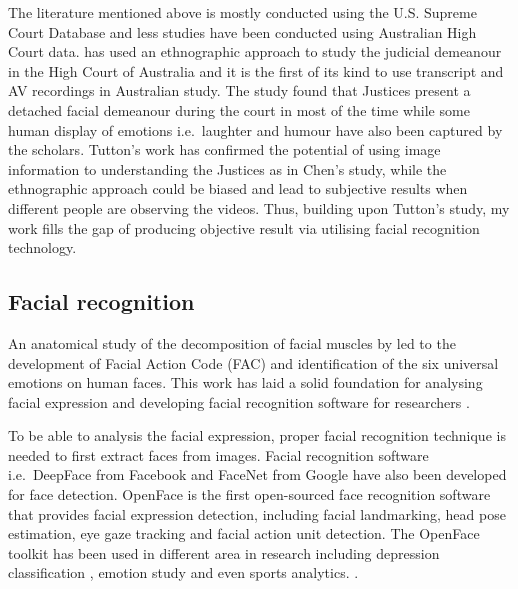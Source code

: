 \documentclass{monashthesis}
\begin{document}
The literature mentioned above is mostly conducted using the U.S. Supreme Court Database and less studies have been conducted using Australian High Court data. \textcite{tutton2018judicial} has used an ethnographic approach to study the judicial demeanour in the High Court of Australia and it is the first of its kind to use transcript and AV recordings in Australian study. The study found that Justices present a detached facial demeanour during the court in most of the time while some human display of emotions i.e.~laughter and humour have also been captured by the scholars. Tutton's work has confirmed the potential of using image information to understanding the Justices as in Chen's study, while the ethnographic approach could be biased and lead to subjective results when different people are observing the videos. Thus, building upon Tutton's study, my work fills the gap of producing objective result via utilising facial recognition technology.

\hypertarget{facial-recognition}{%
\subsection{Facial recognition}\label{facial-recognition}}

An anatomical study of the decomposition of facial muscles by \autocite{ekman1976measuring} led to the development of Facial Action Code (FAC) \autocite{ekman1978} and identification of the six universal emotions on human faces. This work has laid a solid foundation for analysing facial expression and developing facial recognition software for researchers \autocites{Kobayashi1992}{huang1997}{lien2000}{Kappoor2003}{Tong2007}{Cohn2009}{Lucey2010}.

To be able to analysis the facial expression, proper facial recognition technique is needed to first extract faces from images. Facial recognition software i.e.~DeepFace \autocite{taigman2014deepface} from Facebook and FaceNet \autocite{schroff2015facenet} from Google have also been developed for face detection. OpenFace \autocite{baltrusaitis2018openface} is the first open-sourced face recognition software that provides facial expression detection, including facial landmarking, head pose estimation, eye gaze tracking and facial action unit detection. The OpenFace toolkit has been used in different area in research including depression classification \autocites{yang2016decision}{nasir2016multimodal}, emotion study \autocites{Pan2018}{Nasir2016}{Huber2018} and even sports analytics. \autocite{kovalchik2018going}.
\end{document}
